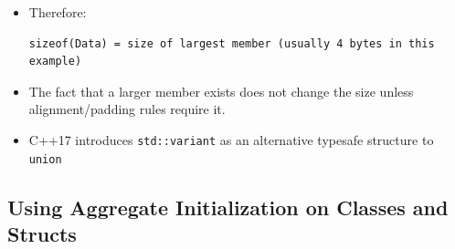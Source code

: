 \documentclass[10pt]{article}
\begin{document}
\begin{itemize}
    \item Therefore:
\begin{verbatim}
sizeof(Data) = size of largest member (usually 4 bytes in this example)
\end{verbatim}

    \item The fact that a larger member exists does not change the size unless
    alignment/padding rules require it.

\item C++17 introduces \verb|std::variant| as an alternative typesafe structure to \verb|union|
\end{itemize}

\newpage

\subsection{Using Aggregate Initialization on Classes and Structs}
\end{document}
